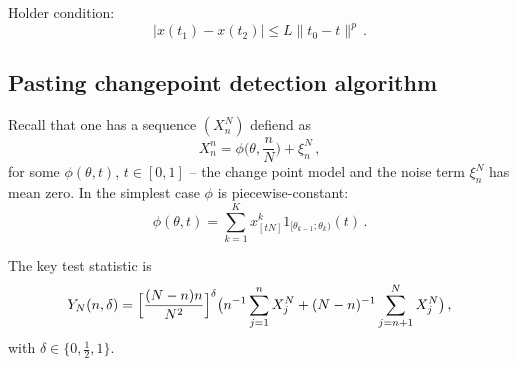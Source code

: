 \documentclass[a4paper]{article}
\begin{document}
H\:older condition:
\[ |x(t_1)-x(t_2)| \leq L\|t_0-t\|^p \,.\]

\subsection{Pasting changepoint detection algorithm} %
\label{sub:pasting_changepoint_detection_algorithm}

Recall that one has a sequence $(X^N_n)$ defiend as
\[ X^n_n = \phi\bigl( \theta, \frac{n}{N}\bigr) + \xi^N_n \,, \]
for some $\phi(\theta, t)$, $t\in [0,1]$ -- the change point model and the noise term
$\xi^N_n$ has mean zero. In the simplest case $\phi$ is piecewise-constant:
\[ \phi(\theta, t) = \sum_{k=1}^K x^k_{[tN]} 1_{ [ \theta_{k-1};\theta_k) }(t)\,. \]

The key test statistic is
\[ Y_N(n,\delta) = \Bigl[ \frac{(N-n)n}{N^2} \Bigr]^\delta
                  \bigl( n^{-1} \sum_{j=1}^n X^N_j
                   + (N-n)^{-1} \sum_{j=n+1}^N X^N_j\bigr) \,, \]
with $\delta\in\{0,\frac{1}{2},1\}$.
\end{document}
